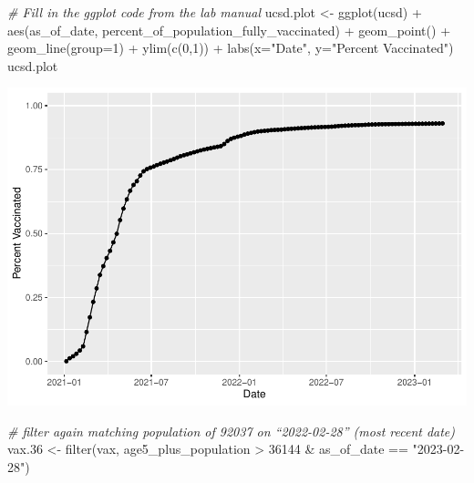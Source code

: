 \documentclass[
]{article}
\newenvironment{Shaded}{\begin{snugshade}}{\end{snugshade}}
\newcommand{\AttributeTok}[1]{\textcolor[rgb]{0.77,0.63,0.00}{#1}}
\newcommand{\CommentTok}[1]{\textcolor[rgb]{0.56,0.35,0.01}{\textit{#1}}}
\newcommand{\DecValTok}[1]{\textcolor[rgb]{0.00,0.00,0.81}{#1}}
\newcommand{\FloatTok}[1]{\textcolor[rgb]{0.00,0.00,0.81}{#1}}
\newcommand{\FunctionTok}[1]{\textcolor[rgb]{0.00,0.00,0.00}{#1}}
\newcommand{\NormalTok}[1]{#1}
\newcommand{\OtherTok}[1]{\textcolor[rgb]{0.56,0.35,0.01}{#1}}
\newcommand{\SpecialCharTok}[1]{\textcolor[rgb]{0.00,0.00,0.00}{#1}}
\newcommand{\StringTok}[1]{\textcolor[rgb]{0.31,0.60,0.02}{#1}}
\begin{document}
\begin{Shaded}
\begin{Highlighting}[]
\CommentTok{\# Fill in the ggplot code from the lab manual}
\NormalTok{ucsd.plot }\OtherTok{\textless{}{-}} \FunctionTok{ggplot}\NormalTok{(ucsd) }\SpecialCharTok{+}
  \FunctionTok{aes}\NormalTok{(as\_of\_date,}
\NormalTok{      percent\_of\_population\_fully\_vaccinated) }\SpecialCharTok{+}
  \FunctionTok{geom\_point}\NormalTok{() }\SpecialCharTok{+}
  \FunctionTok{geom\_line}\NormalTok{(}\AttributeTok{group=}\DecValTok{1}\NormalTok{) }\SpecialCharTok{+}
  \FunctionTok{ylim}\NormalTok{(}\FunctionTok{c}\NormalTok{(}\DecValTok{0}\NormalTok{,}\DecValTok{1}\NormalTok{)) }\SpecialCharTok{+}
  \FunctionTok{labs}\NormalTok{(}\AttributeTok{x=}\StringTok{"Date"}\NormalTok{, }\AttributeTok{y=}\StringTok{"Percent Vaccinated"}\NormalTok{)}
\NormalTok{ucsd.plot}
\end{Highlighting}
\end{Shaded}

\includegraphics{Lab-17-MiniAssn_files/figure-latex/unnamed-chunk-25-1.pdf}

\begin{Shaded}
\begin{Highlighting}[]
\CommentTok{\# filter again matching population of 92037 on “2022{-}02{-}28” (most recent date)}
\NormalTok{vax}\FloatTok{.36} \OtherTok{\textless{}{-}} \FunctionTok{filter}\NormalTok{(vax, age5\_plus\_population }\SpecialCharTok{\textgreater{}} \DecValTok{36144} \SpecialCharTok{\&}\NormalTok{ as\_of\_date }\SpecialCharTok{==} \StringTok{"2023{-}02{-}28"}\NormalTok{)}
\end{Highlighting}
\end{Shaded}
\end{document}
